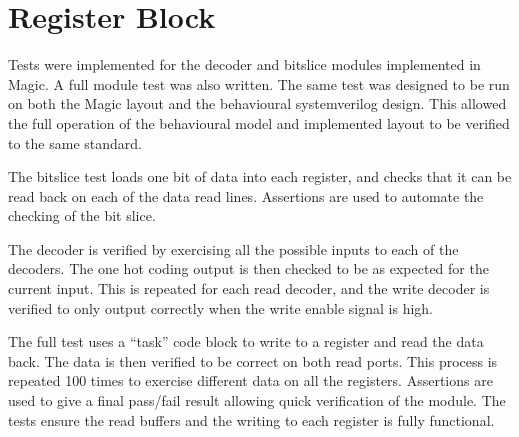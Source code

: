 
\section{Register Block}

Tests were implemented for the decoder and bitslice modules implemented in Magic. 
A full module test was also written. 
The same test was designed to be run on both the Magic layout and the behavioural systemverilog design. 
This allowed the full operation of the behavioural model and implemented layout to be verified to the same standard. 

The bitslice test loads one bit of data into each register, and checks that it can be read back on each of the data read lines.
Assertions are used to automate the checking of the bit slice.

The decoder is verified by exercising all the possible inputs to each of the decoders.
The one hot coding output is then checked to be as expected for the current input. %
This is repeated for each read decoder, and the write decoder is verified to only output correctly when the write enable signal is high. 

The full test uses a ``task'' code block to write to a register and read the data back.
The data is then verified to be correct on both read ports.
This process is repeated 100 times to exercise different data on all the registers. 
Assertions are used to give a final pass/fail result allowing quick verification of the module.
The tests ensure the read buffers and the writing to each register is fully functional.




